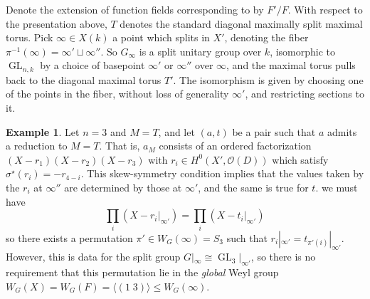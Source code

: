 \documentclass[openany]{amsbook}
\theoremstyle{definition}
\newtheorem{example}[theorem]{Example}
\theoremstyle{remark}
\numberwithin{equation}{section}
\renewcommand{\O}{\mathcal{O}}
\renewcommand{\-}{\operatorname{-}}
\newcommand{\GL}{\operatorname{GL}}
\begin{document}
Denote the extension of function fields corresponding to by $F'/F$. With respect to the presentation above, $T$ denotes the standard diagonal maximally split maximal torus. Pick $\infty \in X(k)$ a point which splits in $X'$, denoting the fiber $\pi^{-1}(\infty) = \infty' \sqcup \infty''$. So $G_\infty$ is a split unitary group over $k$, isomorphic to $\GL_{n,k}$ by a choice of basepoint $\infty'$ or $\infty''$ over $\infty$, and the maximal torus pulls back to the diagonal maximal torus $T'$. The isomorphism is given by choosing one of the points in the fiber, without loss of generality $\infty'$, and restricting sections to it.

\begin{example}
    Let $n = 3$ and $M = T$, and let $(a,t)$ be a pair such that $a$ admits a reduction to $M = T$. That is, $a_M$ consists of an ordered factorization $(X - r_1)(X - r_2)(X - r_3)$ with $r_i \in H^0(X', \O(D))$ which satisfy $\sigma^\star(r_i) = - r_{4-i}$. This skew-symmetry condition implies that the values taken by the $r_i$ at $\infty''$ are determined by those at $\infty'$, and the same is true for $t$. we must have
    \[
        \prod_i (X - r_i|_{\infty'}) = \prod_i (X - t_i|_{\infty'})
    \]
    so there exists a permutation $\pi' \in W_G(\infty) = S_3$ such that $r_i|_{\infty'} = t_{\pi'(i)}|_{\infty'}$. However, this is data for the split group $G|_{\infty} \cong \GL_3|_{\infty'}$, so there is no requirement that this permutation lie in the \textit{global} Weyl group $W_G(X) = W_G(F) = \langle (1 \; 3) \rangle \le W_G(\infty)$.
    

\end{example}
\end{document}
